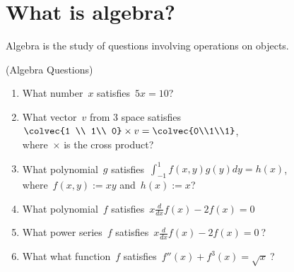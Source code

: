 \section{What is algebra?}
Algebra is the study of  questions involving operations on objects. 
\begin{example} (Algebra Questions) \\[-.5cm]
\begin{enumerate}
\item What number~$x$ satisfies~$5x=10$?\\[-.8cm]
\item What vector~$v$ from 3 space satisfies~$ \colvec{1 \\ 1\\ 0} \times v = \colvec{0\\1\\1}$,\\[.0cm]
where~$\times$ is the cross product?\\[-.4cm]
\item What polynomial~$g$ satisfies~$\int_{-1}^1 f(x,y)g(y) dy = h(x)$, \\[.2cm]
 where~$f(x,y):=xy$ and~$h(x):=x$?\\[-.5cm]
\item What polynomial~$f$ satisfies~$x\frac{d}{dx} f(x) -2f(x)=0~$
\item What power series~$f$ satisfies~$x\frac{d}{dx} f(x) -2f(x)=0~$?
\item What what function~$f$ satisfies~$f''(x)+f^3(x) =\sqrt{x}~$?
\end{enumerate}
\end{example}


